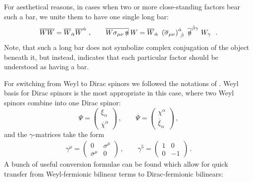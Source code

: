 \documentclass[12pt]{revtex4}
\newcommand{\slashed}[1]{\hbox{{$#1$}\llap{$/$}}}
\begin{document}
For aesthetical reasons, in cases when two or more close-standing
factors bear such a bar, we unite them to have one single 
long bar:
\[
\overline{W W} = \overline{W}_{\dot\alpha}
 \overline{W}^{\dot\alpha}~,
\qquad
\overline{W \sigma_{\mu\nu}\, \slashed{n}}\, W = 
\overline{W}_{\dot\alpha}\,\, 
\left(\overline{\sigma}_{\mu\nu}\right)
^{\dot\alpha}_{~\dot\beta}\,\,
\overline{\slashed{n}}^{\dot\beta \gamma}\,\,
W_\gamma~
~.
\]
Note, that such a long bar does not symbolize complex conjugation
of the object beneath it, but instead, indicates that each particular
factor should be understood as having a bar.

For switching from Weyl to Dirac spinors we followed the notations of 
\cite{Martin:1997ns}.
Weyl basis for Dirac spinors is the most appropriate in this case,
where two Weyl spinors combine into one Dirac spinor:
\[
\Psi = 
\left (
\begin{array}{c}
  \xi_\alpha \\
\overline{\chi}^{\dot\alpha}
\end{array}
\right )\,,
\qquad
\overline{\Psi} = 
\left (
\begin{array}{c}
  \chi^\alpha \\
\overline{\xi}_{\dot\alpha}
\end{array}
\right )\,,
\]
and the $ \gamma $-matrices take the form
\begin{eqnarray*}
\gamma^\mu = 
\left ( 
\begin{array}{cc}
0                    &    \sigma^\mu \\
                     \overline{\sigma}^\mu   &         0    
\end{array}
\right )\,,
\qquad
\gamma^5 = 
\left ( 
\begin{array}{cc}
1      &         0  \\
                        0      &        -1    
\end{array}
\right )\,.
\end{eqnarray*}
A bunch of useful conversion formulae can be found
\cite{Martin:1997ns}
which allow for quick transfer from Weyl-fermionic
bilinear terms to Dirac-fermionic bilinears:
\end{document}
